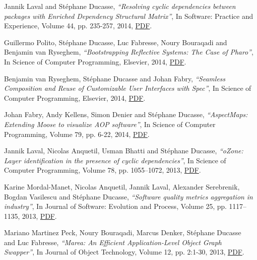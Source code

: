 \documentclass{article}
\newcommand{\czauthors}[1]{#1}
\newcommand{\cztitle}[1]{\emph{``#1''}}
\newcommand{\czjournal}[1]{#1}
\begin{document}
\begin{itemize}
	\pub  \czauthors{Jannik Laval and St\'ephane Ducasse},  \cztitle{Resolving cyclic dependencies between packages with Enriched Dependency Structural Matrix},  In \czjournal{Software: Practice and Experience}, Volume 44, pp. 235-257, 2014, \href{http://rmod-files.lille.inria.fr/Team/Texts/Papers/Lava14b-Official-SoftwarePracticeExperience-ResolvingCyclicDependencies.pdf}{PDF}.

	\pub  \czauthors{Guillermo Polito, St\'ephane Ducasse, Luc Fabresse, Noury Bouraqadi and Benjamin van Ryseghem},  \cztitle{Bootstrapping Reflective Systems: The Case of Pharo},  In \czjournal{Science of Computer Programming}, Elsevier, 2014, \href{http://rmod-files.lille.inria.fr/Team/Texts/Papers/Poli14c-BootstrappingASmalltalk-ScienceOfComputerProgramming.pdf}{PDF}.

	\pub  \czauthors{Benjamin van Ryseghem, St\'ephane Ducasse and Johan Fabry},  \cztitle{Seamless Composition and Reuse of Customizable User Interfaces with Spec},  In \czjournal{Science of Computer Programming}, Elsevier, 2014, \href{http://rmod-files.lille.inria.fr/Team/Texts/Papers/Ryse14a-SCICO-Spec.pdf}{PDF}.

	\pub  \czauthors{Johan Fabry, Andy Kellens, Simon Denier and St\'ephane Ducasse},  \cztitle{AspectMaps: Extending Moose to visualize AOP software},  In \czjournal{Science of Computer Programming}, Volume 79, pp. 6-22, 2014, \href{http://rmod-files.lille.inria.fr/Team/Texts/Papers/Fabr14b-Official-SCP-AspectMaps.pdf}{PDF}.

	\pub  \czauthors{Jannik Laval, Nicolas Anquetil, Usman Bhatti and St\'ephane Ducasse},  \cztitle{oZone: Layer identification in the presence of cyclic dependencies},  In \czjournal{Science of Computer Programming}, Volume 78, pp. 1055--1072, 2013, \href{http://rmod-files.lille.inria.fr/Team/Texts/Papers/Lava13a-Official-OzoneLayer-SCO.pdf}{PDF}.

	\pub  \czauthors{Karine Mordal{-}Manet, Nicolas Anquetil, Jannik Laval, Alexander Serebrenik, Bogdan Vasilescu and St\'ephane Ducasse},  \cztitle{Software quality metrics aggregation in industry},  In \czjournal{Journal of Software: Evolution and Process}, Volume 25, pp. 1117--1135, 2013, \href{http://rmod-files.lille.inria.fr/Team/Texts/Papers/Mord12b-Official-JSoft-MetricAggregation.pdf}{PDF}.

	\pub  \czauthors{Mariano Martinez Peck, Noury Bouraqadi, Marcus Denker, St\'ephane Ducasse and Luc Fabresse},  \cztitle{Marea: An Efficient Application-Level Object Graph Swapper},  In \czjournal{Journal of Object Technology}, Volume 12, pp. 2:1-30, 2013, \href{http://rmod-files.lille.inria.fr/Team/Texts/Papers/Mart12c-JOT-Marea.pdf}{PDF}.


\end{itemize}
\end{document}
